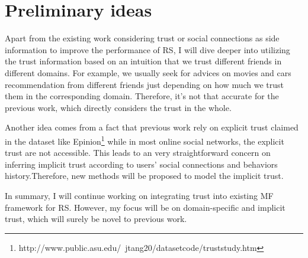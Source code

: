 \section{Preliminary ideas}
Apart from the existing work considering trust or social connections as side information to improve the performance of RS, I will dive deeper into utilizing the trust information based on an intuition that we trust different friends in different domains. For example, we usually seek for advices on movies and cars recommendation from different friends just depending on how much we trust them in the corresponding domain. Therefore, it's not that accurate for the previous work, which directly considers the trust in the whole.

Another idea comes from a fact that previous work rely on explicit trust claimed in the dataset like Epinion\footnote{http://www.public.asu.edu/~jtang20/datasetcode/truststudy.htm} while in most online social networks, the explicit trust are not accessible. This leads to an very straightforward concern on inferring implicit trust according to users' social connections and behaviors history.Therefore, new methods will be proposed to model the implicit trust.

In summary, I will continue working on integrating trust into existing MF framework for RS. However, my focus will be on domain-specific and implicit trust, which will surely be novel to previous work.
